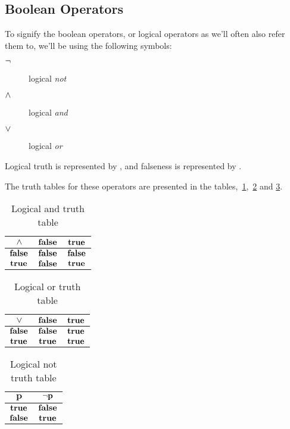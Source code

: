 \subsection{Boolean Operators}
\label{sec:boolean-operators}

To signify the boolean operators, or logical operators as we'll often
also refer them to, we'll be using the following symbols:

\begin{description}
\item[$\neg$] logical \textit{not}
\item[$\wedge$] logical \textit{and}
\item[$\vee$] logical \textit{or}
\end{description}

Logical truth is represented by \True, and falseness is represented by
\False.

The truth tables for these operators are presented in the
tables,~\ref{tab:log-and-table},~\ref{tab:log-or-table} and
\ref{tab:log-not-table}.

\begin{table}
  \centering
  \begin{tabular}{|c|c|c|}
    \hline
    $\mathbf{\wedge}$ & $\mathbf{\textbf{false}}$ & $\mathbf{\textbf{true}}$ \\ \hline
    $\mathbf{\textbf{false}}$ & $\mathbf{\textbf{false}}$ & $\mathbf{\textbf{false}}$ \\ \hline
    $\mathbf{\textbf{true}}$ & $\mathbf{\textbf{false}}$ & $\mathbf{\textbf{true}}$ \\ \hline
  \end{tabular}
  \caption{Logical and truth table}
  \label{tab:log-and-table}
\end{table}

\begin{table}
  \centering
  \begin{tabular}{|c|c|c|}
    \hline
    $\mathbf{\vee}$ & $\mathbf{\textbf{false}}$ & $\mathbf{\textbf{true}}$ \\ \hline
    $\mathbf{\textbf{false}}$ & $\textbf{false}$ & $\textbf{true}$ \\ \hline
    $\mathbf{\textbf{true}}$ & $\textbf{true}$ & $\textbf{true}$ \\ \hline
  \end{tabular}
  \caption{Logical or truth table}
  \label{tab:log-or-table}
\end{table}

\begin{table}
  \centering
  \begin{tabular}{|c|c|}
    \hline
    $\mathbf{p}$ & $\mathbf{\neg p}$ \\ \hline
    $\textbf{true}$ & $\textbf{false}$ \\ \hline
    $\textbf{false}$ & $\textbf{true}$ \\ \hline
  \end{tabular}
  \caption{Logical not truth table}
  \label{tab:log-not-table}
\end{table}

